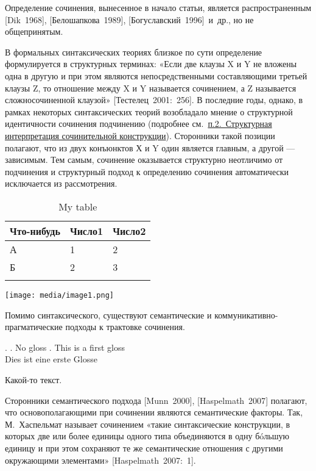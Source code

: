 Определение сочинения, вынесенное в начало статьи, является
распространенным {[}Dik~1968{]}, {[}Белошапкова~1989{]},
{[}Богуславский~1996{]}~и~др., но не общепринятым.

В формальных синтаксических теориях близкое по сути определение
формулируется в структурных терминах: «Если две клаузы X и Y не вложены
одна в другую и при этом являются непосредственными составляющими
третьей клаузы Z, то отношение между X и Y называется сочинением, а Z
называется сложносочиненной клаузой» {[}Тестелец~2001:~256{]}. В
последние годы, однако, в рамках некоторых синтаксических теорий
возобладало мнение о структурной идентичности сочинения подчинению
(подробнее см.~\underline{п.2.~Структурная интерпретация сочинительной
  конструкции}). Сторонники такой позиции полагают, что из двух конъюнктов
Х и Y один является главным, а другой --- зависимым. Тем самым, сочинение
оказывается структурно неотличимо от подчинения и структурный подход к
определению сочинения автоматически исключается из рассмотрения.

\begin{longtable}[]{@{}lll@{}}
  \toprule
  Что-нибудь & Число1 & Число2 \\
  \midrule
  \endhead
  А          & 1      & 2      \\
  Б          & 2      & 3      \\
  \bottomrule
  \caption{My table}\label{tab:label}
\end{longtable}

\texttt{[image: media/image1.png]}

Помимо синтаксического, существуют семантические и
коммуникативно-прагматические подходы к трактовке сочинения.

\exg.\label{gl:label}
\a. No gloss
\bg. This is a first gloss\\
Dies ist eine erste Glosse\\

\begin{env}
    Какой-то текст.
\end{env}

Сторонники семантического подхода {[}Munn~2000{]}, {[}Haspelmath~2007{]}
полагают, что основополагающими при сочинении являются семантические
факторы. Так, М.~Хаспельмат называет сочинением «такие синтаксические
конструкции, в которых две или более единицы одного типа объединяются в
одну бóльшую единицу и при этом сохраняют те же семантические отношения
с другими окружающими элементами» {[}Haspelmath~2007:~1{]}.

